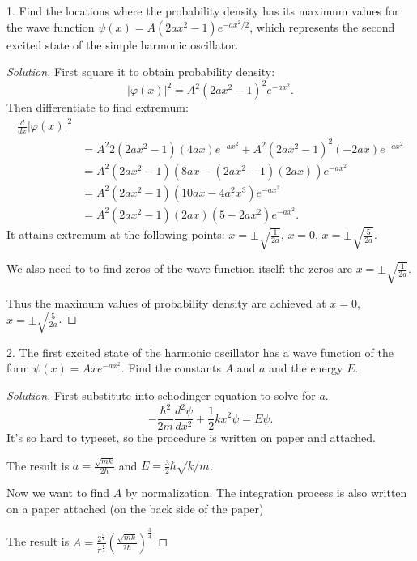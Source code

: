 
1. Find the locations where the probability density has its maximum values for the wave function $\psi(x)=A\left(2 a x^2-1\right) e^{-a x^2 / 2}$, which represents the second excited state of the simple harmonic oscillator.
\begin{proof}[Solution]
	First square it to obtain probability density:
	\[
		|\varphi(x)|^2 = A^2 (2 a x^2 - 1)^2 e^{- a x^2}
	.\] 
	Then differentiate to find extremum:
	\begin{align*}
		\frac{d}{dx} |\varphi(x)|^2 \\
		&= A^2 2(2 a x^2 - 1) (4 a x) e^{- a x ^2} + A^2 (2 a x^2 - 1)^2 (- 2 a x) e^{- a x^2}\\
		&= A^2(2 a x^2 - 1) (8 a x - (2 a x^2 - 1)(2 a x)) e^{- a x^2} \\
		&= A^2(2 a x^2 - 1) (10 a x - 4 a^2 x^3) e^{- a x^2} \\
		&= A^2(2 a x^2 - 1) (2ax)( 5  - 2a x^2) e^{- a x^2}
	.\end{align*} 
	It attains extremum at the following points: $x = \pm \sqrt{\frac{1}{2a}} $, $x = 0$,  $x = \pm \sqrt{\frac{5}{2a}} $.

	We also need to to find zeros of the wave function itself:
	 the zeros are $x = \pm \sqrt{\frac{1}{2a}} $.

	Thus the maximum values of probability density are achieved at $x = 0$,  $x = \pm \sqrt{\frac{5}{2a}} $.
\end{proof}

2. The first excited state of the harmonic oscillator has a wave function of the form $\psi(x)=A x e^{-a x^2}$. Find the constants $A$ and $a$ and the energy $E$.
\begin{proof}[Solution]
	First substitute into schodinger equation to solve for $a$.
\[
	-\frac{\hbar^2}{2 m} \frac{d^2 \psi}{d x^2}+\frac{1}{2} k x^2 \psi=E \psi
.\] 
It's so hard to typeset, so the procedure is written on paper and attached.

The result is $a = \frac{\sqrt{mk}}{2 \hbar} $ and $E = \frac{3}{2} \hbar \sqrt{k / m} $.

Now we want to find $A$ by normalization. The integration process is also written on a paper attached (on the back side of the paper)

The result is $A = \frac{2^{\frac{5}{4}}}{\pi^{\frac{1}{4}}} \left( \frac{\sqrt{mk} }{2 \hbar} \right)^{\frac{3}{4}} $
\end{proof}

